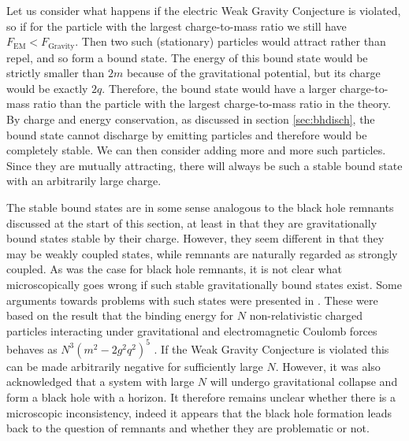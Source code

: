\documentclass[11pt,a4paper]{article}
\numberwithin{equation}{section}
\numberwithin{table}{section}\setlength{\multlinegap}{25pt}
\newcommand{\be}{\begin{equation}}
\newcommand{\ee}{\end{equation}}
\begin{document}
Let us consider what happens if the electric Weak Gravity Conjecture is violated, so if for the particle with the largest charge-to-mass ratio we still have $F_{\mathrm{EM}} < F_{\mathrm{Gravity}}$. Then two such (stationary) particles would attract rather than repel, and so form a bound state. The energy of this bound state would be strictly smaller than $2m$ because of the gravitational potential, but its charge would be exactly $2 q$. Therefore, the bound state would have a larger charge-to-mass ratio than the particle with the largest charge-to-mass ratio in the theory. By charge and energy conservation, as discussed in section \ref{sec:bhdisch}, the bound state cannot discharge by emitting particles and therefore would be completely stable. We can then consider adding more and more such particles. Since they are mutually attracting, there will always be such a stable bound state with an arbitrarily large charge. 

The stable bound states are in some sense analogous to the black hole remnants discussed at the start of this section, at least in that they are gravitationally bound states stable by their charge. However, they seem different in that they may be weakly coupled states, while remnants are naturally regarded as strongly coupled. As was the case for black hole remnants, it is not clear what microscopically goes wrong if such stable gravitationally bound states exist. Some arguments towards problems with such states were presented in \cite{Cottrell:2016bty}. These were based on the result that the binding energy for $N$ non-relativistic charged particles interacting under gravitational and electromagnetic Coulomb forces behaves as $N^3 \left(m^2 - 2 g^2q^2\right)^5$ \cite{1992PhR163J}. If the Weak Gravity Conjecture is violated this can be made arbitrarily negative for sufficiently large $N$. However, it was also acknowledged that a system with large $N$ will undergo gravitational collapse and form a black hole with a horizon. It therefore remains unclear whether there is a microscopic inconsistency, indeed it appears that the black hole formation leads back to the question of remnants and whether they are problematic or not.

\end{document}
